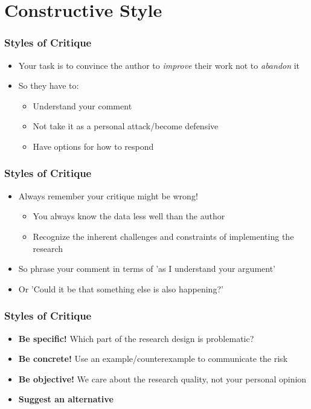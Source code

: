 \documentclass[xcolor=x11names,compress]{beamer}\usepackage[]{graphicx}\usepackage[]{color}
\renewcommand{\(}{\begin{columns}}
\renewcommand{\)}{\end{columns}}
\newcommand{\<}[1]{\begin{column}{#1}}
\renewcommand{\>}{\end{column}}
\begin{document}
\section{Constructive Style}

\begin{frame}
\frametitle{Styles of Critique}
\begin{itemize}
\item Your task is to convince the author to \textit{improve} their work not to \textit{abandon} it
\pause
\item So they have to:
\begin{itemize}
\item Understand your comment
\pause
\item Not take it as a personal attack/become defensive
\pause
\item Have options for how to respond
\end{itemize}
\end{itemize}
\end{frame}

\begin{frame}
\frametitle{Styles of Critique}
\begin{itemize}
\item Always remember your critique might be wrong!
\pause
\begin{itemize}
\item You always know the data less well than the author
\pause
\item Recognize the inherent challenges and constraints of implementing the research
\pause
\end{itemize}
\item So phrase your comment in terms of 'as I understand your argument'
\pause
\item Or 'Could it be that something else is also happening?'
\end{itemize}
\end{frame}

\begin{frame}
\frametitle{Styles of Critique}
\begin{itemize}
\item \textbf{Be specific!} Which part of the research design is problematic?
\pause
\item \textbf{Be concrete!} Use an example/counterexample to communicate the risk
\pause
\item \textbf{Be objective!} We care about the research quality, not your personal opinion
\pause
\item \textbf{Suggest an alternative}
\end{itemize}
\end{frame}
\end{document}
